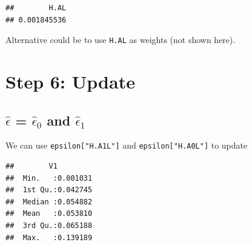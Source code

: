 \documentclass[
]{book}
\newenvironment{Shaded}{\begin{snugshade}}{\end{snugshade}}
\newcommand{\FunctionTok}[1]{\textcolor[rgb]{0.00,0.00,0.00}{#1}}
\newcommand{\NormalTok}[1]{#1}
\newcommand{\OtherTok}[1]{\textcolor[rgb]{0.56,0.35,0.01}{#1}}
\newcommand{\SpecialCharTok}[1]{\textcolor[rgb]{0.00,0.00,0.00}{#1}}
\newcommand{\StringTok}[1]{\textcolor[rgb]{0.31,0.60,0.02}{#1}}
\begin{document}
\begin{verbatim}
##        H.AL 
## 0.001845536
\end{verbatim}

Alternative could be to use \texttt{H.AL} as weights (not shown here).

\hypertarget{step-6-update}{%
\section{Step 6: Update}\label{step-6-update}}

\hypertarget{hatepsilon-hatepsilon_0-and-hatepsilon_1-1}{%
\subsection{\texorpdfstring{\(\hat\epsilon\) = \(\hat\epsilon_0\) and \(\hat\epsilon_1\)}{\textbackslash hat\textbackslash epsilon = \textbackslash hat\textbackslash epsilon\_0 and \textbackslash hat\textbackslash epsilon\_1}}\label{hatepsilon-hatepsilon_0-and-hatepsilon_1-1}}

We can use \texttt{epsilon{[}"H.A1L"{]}} and \texttt{epsilon{[}"H.A0L"{]}} to update

\begin{Shaded}
\end{Shaded}

\begin{verbatim}
##        V1          
##  Min.   :0.001031  
##  1st Qu.:0.042745  
##  Median :0.054882  
##  Mean   :0.053810  
##  3rd Qu.:0.065188  
##  Max.   :0.139189
\end{verbatim}
\end{document}
